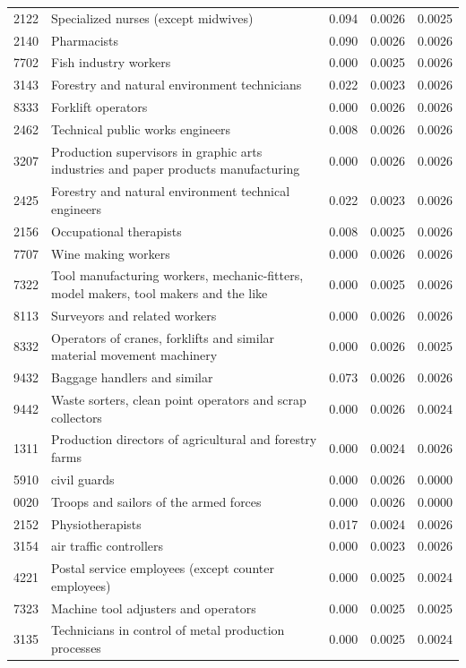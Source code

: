 \begin{longtable}{p{}>{\raggedright\arraybackslash}p{}rrr}
2122 & Specialized nurses (except midwives) & 0.094 & 0.0026 & 0.0025 \\
2140 & Pharmacists & 0.090 & 0.0026 & 0.0026 \\
7702 & Fish industry workers & 0.000 & 0.0025 & 0.0026 \\
3143 & Forestry and natural environment technicians & 0.022 & 0.0023 & 0.0026 \\
8333 & Forklift operators & 0.000 & 0.0026 & 0.0026 \\
2462 & Technical public works engineers & 0.008 & 0.0026 & 0.0026 \\
3207 & Production supervisors in graphic arts industries and paper products manufacturing & 0.000 & 0.0026 & 0.0026 \\
2425 & Forestry and natural environment technical engineers & 0.022 & 0.0023 & 0.0026 \\
2156 & Occupational therapists & 0.008 & 0.0025 & 0.0026 \\
7707 & Wine making workers & 0.000 & 0.0026 & 0.0026 \\
7322 & Tool manufacturing workers, mechanic-fitters, model makers, tool makers and the like & 0.000 & 0.0025 & 0.0026 \\
8113 & Surveyors and related workers & 0.000 & 0.0026 & 0.0026 \\
8332 & Operators of cranes, forklifts and similar material movement machinery & 0.000 & 0.0026 & 0.0025 \\
9432 & Baggage handlers and similar & 0.073 & 0.0026 & 0.0026 \\
9442 & Waste sorters, clean point operators and scrap collectors & 0.000 & 0.0026 & 0.0024 \\
1311 & Production directors of agricultural and forestry farms & 0.000 & 0.0024 & 0.0026 \\
5910 & civil guards & 0.000 & 0.0026 & 0.0000 \\
0020 & Troops and sailors of the armed forces & 0.000 & 0.0026 & 0.0000 \\
2152 & Physiotherapists & 0.017 & 0.0024 & 0.0026 \\
3154 & air traffic controllers & 0.000 & 0.0023 & 0.0026 \\
4221 & Postal service employees (except counter employees) & 0.000 & 0.0025 & 0.0024 \\
7323 & Machine tool adjusters and operators & 0.000 & 0.0025 & 0.0025 \\
3135 & Technicians in control of metal production processes & 0.000 & 0.0025 & 0.0024 \\

\end{longtable}
